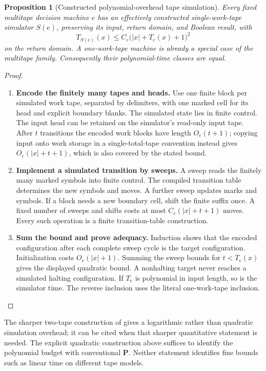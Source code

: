 \documentclass[11pt,a4paper]{article}
\numberwithin{algorithm}{section}
\numberwithin{equation}{section}
\newtheorem{proposition}[proposition]{Proposition}
\theoremstyle{definition}
\theoremstyle{remark}
\theoremstyle{plain}
\theoremstyle{definition}
\theoremstyle{plain}
\begin{document}
\begin{proposition}[Constructed polynomial-overhead tape simulation]
\label{prop:wc-tape}
Every fixed multitape decision machine $e$ has an effectively
constructed single-work-tape simulator $S(e)$, preserving its input,
return domain, and Boolean result, with
\[
 T_{S(e)}(x)\le C_e\bigl(|x|+T_e(x)+1\bigr)^2
\]
on the return domain. A one-work-tape machine is already a special
case of the multitape family. Consequently their polynomial-time
classes are equal.
\end{proposition}
\begin{proof}\leavevmode
\begin{enumerate}[leftmargin=*,align=left]
\item \textbf{Encode the finitely many tapes and heads.}
Use one finite block per simulated work tape, separated by delimiters,
with one marked cell for its head and explicit boundary blanks. The
simulated state lies in finite control. The input head can be retained
on the simulator's read-only input tape. After $t$ transitions the
encoded work blocks have length $O_e(t+1)$; copying input onto work
storage in a single-total-tape convention instead gives
$O_e(|x|+t+1)$, which is also covered by the stated bound.
\item \textbf{Implement a simulated transition by sweeps.}
A sweep reads the finitely many marked symbols into finite control.
The compiled transition table determines the new symbols and moves.
A further sweep updates marks and symbols. If a block needs a new
boundary cell, shift the finite suffix once. A fixed number of sweeps
and shifts costs at most $C_e(|x|+t+1)$ moves. Every such operation
is a finite transition-table construction.
\item \textbf{Sum the bound and prove adequacy.}
Induction shows that the encoded configuration after each complete
sweep cycle is the target configuration. Initialization costs
$O_e(|x|+1)$. Summing the sweep bounds for $t<T_e(x)$ gives the
displayed quadratic bound. A nonhalting target never reaches a
simulated halting configuration. If $T_e$ is polynomial in input
length, so is the simulator time. The reverse inclusion uses the
literal one-work-tape inclusion.
\end{enumerate}
\end{proof}

The sharper two-tape construction of \citet{HennieStearns1966}
gives a logarithmic rather than quadratic simulation overhead; it can
be cited when that sharper quantitative statement is needed. The
explicit quadratic construction above suffices to identify the
polynomial budget with conventional $\mathbf P$. Neither statement
identifies fine bounds such as linear time on different tape models.
\end{document}
